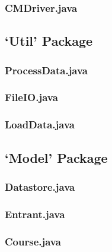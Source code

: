 \documentclass[a4paper, 10pt]{article}
\begin{document}
\subsubsection{CMDriver.java}


\clearpage
\subsection{`Util' Package}

\subsubsection{ProcessData.java}


\clearpage
\subsubsection{FileIO.java}


\clearpage
\subsubsection{LoadData.java}


\clearpage
\subsection{`Model' Package}

\subsubsection{Datastore.java}


\clearpage
\subsubsection{Entrant.java}


\clearpage
\subsubsection{Course.java}

\end{document}
